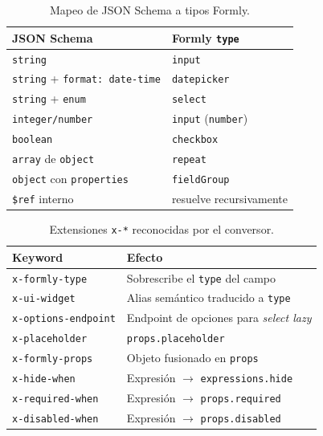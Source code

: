 \begin{table}[!htbp]
\caption{Mapeo de JSON Schema a tipos Formly.}
\label{tab:mapeo}
\centering
\begin{tabular}{|l|l|}
\hline
\textbf{JSON Schema} & \textbf{Formly \texttt{type}} \\ \hline
\texttt{string} & \texttt{input} \\ \hline
\texttt{string} + \texttt{format: date-time} & \texttt{datepicker} \\ \hline
\texttt{string} + \texttt{enum} & \texttt{select} \\ \hline
\texttt{integer/number} & \texttt{input} (\texttt{number}) \\ \hline
\texttt{boolean} & \texttt{checkbox} \\ \hline
\texttt{array} de \texttt{object} & \texttt{repeat} \\ \hline
\texttt{object} con \texttt{properties} & \texttt{field\allowbreak Group} \\ \hline
\texttt{\$ref} interno & resuelve recursivamente \\ \hline
\end{tabular}
\end{table}

\begin{table}[!htbp]
\caption{Extensiones \texttt{x-*} reconocidas por el conversor.}
\label{tab:keywords}
\centering
\begin{tabular}{|l|p{6.8cm}|}
\hline
\textbf{Keyword} & \textbf{Efecto} \\ \hline
\texttt{x-\allowbreak formly-\allowbreak type} & Sobrescribe el \texttt{type} del campo \\ \hline
\texttt{x-\allowbreak ui-\allowbreak widget} & Alias semántico traducido a \texttt{type} \\ \hline
\texttt{x-\allowbreak options-\allowbreak endpoint} & Endpoint de opciones para \emph{select lazy} \\ \hline
\texttt{x-placeholder} & \texttt{props.placeholder} \\ \hline
\texttt{x-formly-props} & Objeto fusionado en \texttt{props} \\ \hline
\texttt{x-hide-when} & Expresión $\rightarrow$ \texttt{expressions.hide} \\ \hline
\texttt{x-required-when} & Expresión $\rightarrow$ \texttt{props.required} \\ \hline
\texttt{x-disabled-when} & Expresión $\rightarrow$ \texttt{props.disabled} \\ \hline
\end{tabular}
\end{table}

